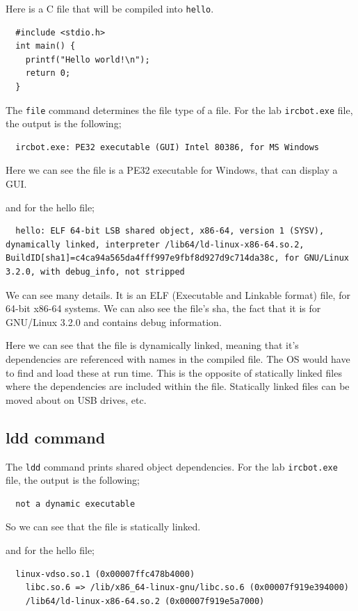 \documentclass[]{project_plan}
\begin{document}
Here is a C file that will be compiled into \lstinline|hello|.
\begin{lstlisting}
  #include <stdio.h>
  int main() {
    printf("Hello world!\n");
    return 0;
  }
\end{lstlisting}

The \lstinline|file| command determines the file type of a file. For the lab
\lstinline|ircbot.exe| file, the output is the following;

\begin{lstlisting}
  ircbot.exe: PE32 executable (GUI) Intel 80386, for MS Windows
\end{lstlisting}

Here we can see the file is a PE32 executable for Windows, that can display a GUI.

and for the hello file;
\begin{lstlisting}
  hello: ELF 64-bit LSB shared object, x86-64, version 1 (SYSV), dynamically linked, interpreter /lib64/ld-linux-x86-64.so.2, BuildID[sha1]=c4ca94a565da4fff997e9fbf8d927d9c714da38c, for GNU/Linux 3.2.0, with debug_info, not stripped
\end{lstlisting}

We can see many details. It is an ELF (Executable and Linkable format) file, for
64-bit x86-64 systems. We can also see the file's sha, the fact that it is for
GNU/Linux 3.2.0 and contains debug information.

Here we can see that the file is dynamically linked, meaning that it's dependencies
are referenced with names in the compiled file. The OS would have to find and load these
at run time. This is the opposite of statically linked files where the dependencies are
included within the file. Statically linked files can be moved about on USB drives, etc.

\subsection{ldd command}

The \lstinline|ldd| command prints shared object dependencies. For the lab
\lstinline|ircbot.exe| file, the output is the following;
\begin{lstlisting}
  not a dynamic executable
\end{lstlisting}

So we can see that the file is statically linked.

and for the hello file;
\begin{lstlisting}
  linux-vdso.so.1 (0x00007ffc478b4000)
	libc.so.6 => /lib/x86_64-linux-gnu/libc.so.6 (0x00007f919e394000)
	/lib64/ld-linux-x86-64.so.2 (0x00007f919e5a7000)
\end{lstlisting}
\end{document}
